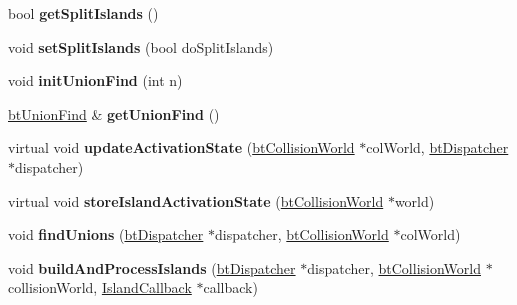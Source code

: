 \begin{DoxyCompactItemize}
\mbox{\label{classbtSimulationIslandManager_ae18b05fce2ab10d425ba0ec0aff0336e}} 
bool {\bfseries get\+Split\+Islands} ()
\item 
\mbox{\label{classbtSimulationIslandManager_a7bbea7ce9ec4c185d0110dd8dff99dd3}} 
void {\bfseries set\+Split\+Islands} (bool do\+Split\+Islands)
\item 
\mbox{\label{classbtSimulationIslandManager_ab9c747e8d11c29f7537c82483280b20d}} 
void {\bfseries init\+Union\+Find} (int n)
\item 
\mbox{\label{classbtSimulationIslandManager_a5a2829a514e99ec4731501b19f21ad29}} 
\hyperlink{classbtUnionFind}{bt\+Union\+Find} \& {\bfseries get\+Union\+Find} ()
\item 
\mbox{\label{classbtSimulationIslandManager_ab3f824f118de81f15ed091c49802aaa6}} 
virtual void {\bfseries update\+Activation\+State} (\hyperlink{classbtCollisionWorld}{bt\+Collision\+World} $\ast$col\+World, \hyperlink{classbtDispatcher}{bt\+Dispatcher} $\ast$dispatcher)
\item 
\mbox{\label{classbtSimulationIslandManager_ab943705ed0eb97dc5fb2531fbcdc91d9}} 
virtual void {\bfseries store\+Island\+Activation\+State} (\hyperlink{classbtCollisionWorld}{bt\+Collision\+World} $\ast$world)
\item 
\mbox{\label{classbtSimulationIslandManager_a3fd9a1a91e254d3f5736b71e48f9e7cc}} 
void {\bfseries find\+Unions} (\hyperlink{classbtDispatcher}{bt\+Dispatcher} $\ast$dispatcher, \hyperlink{classbtCollisionWorld}{bt\+Collision\+World} $\ast$col\+World)
\item 
\mbox{\label{classbtSimulationIslandManager_ab0f52dc46bc01c6754f4cb32ba26c99a}} 
void {\bfseries build\+And\+Process\+Islands} (\hyperlink{classbtDispatcher}{bt\+Dispatcher} $\ast$dispatcher, \hyperlink{classbtCollisionWorld}{bt\+Collision\+World} $\ast$collision\+World, \hyperlink{structbtSimulationIslandManager_1_1IslandCallback}{Island\+Callback} $\ast$callback)

\end{DoxyCompactItemize}

